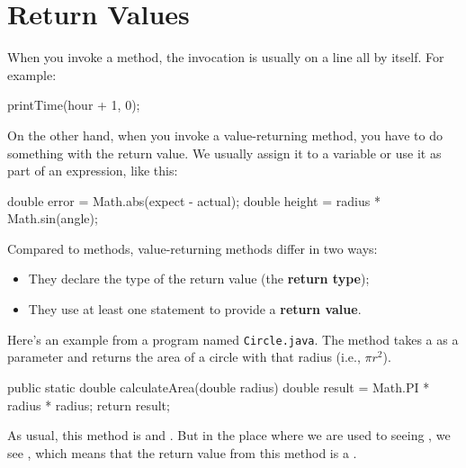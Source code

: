 \section{Return Values}


When you invoke a  method, the invocation is usually on a line all by itself.
For example:

\begin{code}
printTime(hour + 1, 0);
\end{code}

On the other hand, when you invoke a value-returning method, you have to do something with the return value.
We usually assign it to a variable or use it as part of an expression, like this:

\begin{code}
double error = Math.abs(expect - actual);
double height = radius * Math.sin(angle);
\end{code}


Compared to  methods, value-returning methods differ in two ways:


\begin{itemize}

\item They declare the type of the return value (the {\bf return type});

\item They use at least one  statement to provide a {\bf return value}.

\end{itemize}

Here's an example from a program named {\tt Circle.java}.
The  method takes a  as a parameter and returns the area of a circle with that radius (i.e., $\pi r^2$).

\begin{code}
public static double calculateArea(double radius) {
    double result = Math.PI * radius * radius;
    return result;
}
\end{code}

As usual, this method is  and .
But in the place where we are used to seeing , we see , which means that the return value from this method is a .



